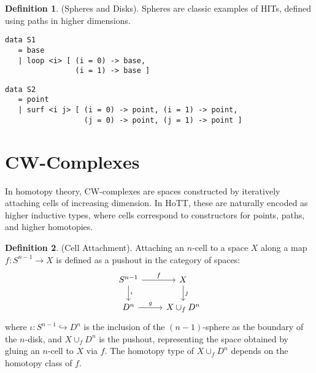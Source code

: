 \documentclass{article}
\theoremstyle{definition}
\newtheorem{definition}{Definition}
\newcommand*{\incmap}{\hookrightarrow}
\begin{document}
\begin{definition} (Spheres and Disks). Spheres are classic examples of HITs, defined using paths in higher dimensions.
\begin{lstlisting}
data S1
   = base
   | loop <i> [ (i = 0) -> base,
                (i = 1) -> base ]
\end{lstlisting}
\begin{lstlisting}
data S2
   = point
   | surf <i j> [ (i = 0) -> point, (i = 1) -> point,
                  (j = 0) -> point, (j = 1) -> point ]
\end{lstlisting}
\end{definition}

\section{CW-Complexes}
In homotopy theory, CW-complexes are spaces constructed by iteratively attaching cells of increasing dimension. In HoTT, these are naturally encoded as higher inductive types, where cells correspond to constructors for points, paths, and higher homotopies.

\begin{definition} (Cell Attachment). Attaching an \( n \)-cell to a space \( X \) along a map \( f : S^{n-1} \to X \) is defined as a pushout in the category of spaces:
\[
\begin{tikzcd}
S^{n-1} \arrow[r, "f"] \arrow[d, "\iota"] & X \arrow[d, "j"] \\
D^n \arrow[r, "g"] & X \cup_f D^n
\end{tikzcd}
\]
where \( \iota : S^{n-1} \incmap D^n \) is the inclusion of the \((n-1)\)-sphere as the boundary of the \( n \)-disk, and \( X \cup_f D^n \) is the pushout, representing the space obtained by gluing an \( n \)-cell to \( X \) via \( f \). The homotopy type of \( X \cup_f D^n \) depends on the homotopy class of \( f \).
\end{definition}
\end{document}
